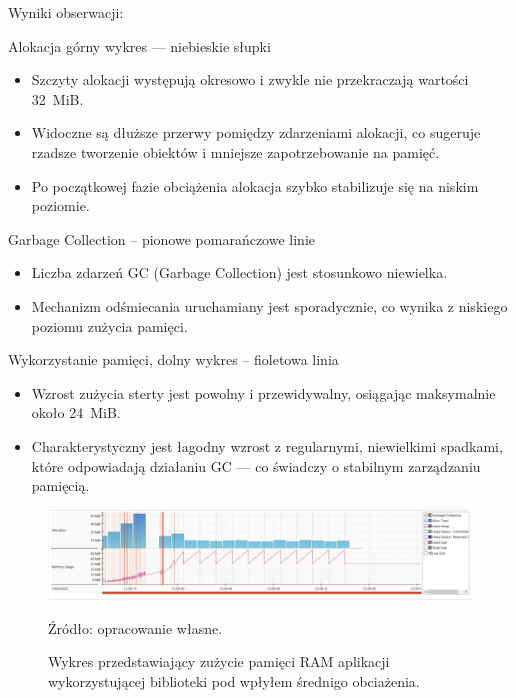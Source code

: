 \documentclass[runningheads,12pt]{llncs}
\begin{document}
Wyniki obserwacji:

Alokacja górny wykres — niebieskie słupki

\begin{itemize}
  \item Szczyty alokacji występują okresowo i zwykle nie przekraczają wartości 32~MiB.
  \item Widoczne są dłuższe przerwy pomiędzy zdarzeniami alokacji, co sugeruje rzadsze tworzenie obiektów i mniejsze zapotrzebowanie na pamięć.
  \item Po początkowej fazie obciążenia alokacja szybko stabilizuje się na niskim poziomie.
\end{itemize}

Garbage Collection – pionowe pomarańczowe linie

\begin{itemize}
  \item Liczba zdarzeń GC (Garbage Collection) jest stosunkowo niewielka.
  \item Mechanizm odśmiecania uruchamiany jest sporadycznie, co wynika z niskiego poziomu zużycia pamięci.
\end{itemize}

Wykorzystanie pamięci, dolny wykres – fioletowa linia

\begin{itemize}
  \item Wzrost zużycia sterty jest powolny i przewidywalny, osiągając maksymalnie około 24~MiB.
  \item Charakterystyczny jest łagodny wzrost z regularnymi, niewielkimi spadkami, które odpowiadają działaniu GC — co świadczy o stabilnym zarządzaniu pamięcią.
\end{itemize}

\newpage

\begin{figure}
    \includegraphics[width=\linewidth]{images/library-memory-midle-graph.jpg}
    \caption{Wykres przedstawiający zużycie pamięci RAM aplikacji wykorzystującej biblioteki pod wpłyłem średnigo obciażenia.} \label{fig1}
    \vspace{0.5em}
    {\small Źródło: opracowanie własne.}
\end{figure}
\end{document}
